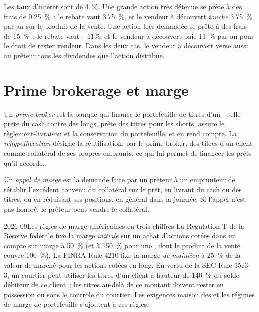 \begin{example}\label{ex:m1:financing:carry}
Les taux d'intérêt sont de 4~\%. Une grande action très détenue se prête à des frais de 0.25~\%~:
le rebate vaut 3.75~\%, et le vendeur à découvert \emph{touche} 3.75~\% par an sur le produit
de la vente. Une action très demandée se prête à des frais de 15~\%~: le rebate vaut
$-11\%$, et le vendeur à découvert paie 11~\% par an pour le droit de rester vendeur. Dans
les deux cas, le vendeur à découvert verse aussi au prêteur tous les dividendes que l'action
distribue.
\end{example}

\section{Prime brokerage et marge}

\begin{definition}\label{def:m1:financing:pb}
Un \emph{prime broker} est la banque qui finance le portefeuille de titres d'un
~: elle prête du cash contre des longs, prête des titres pour les shorts, assure
le règlement-livraison et la conservation du portefeuille, et en rend compte.
La \emph{réhypothécation} désigne la réutilisation, par le prime broker, des
titres d'un client comme collatéral de ses propres emprunts, ce qui lui permet de financer les
prêts qu'il accorde.
\end{definition}

\begin{definition}\label{def:m1:financing:margincall}
Un \emph{appel de marge} est la demande faite par un prêteur à un emprunteur
de rétablir l'excédent convenu du collatéral sur le prêt, en livrant du cash ou des titres, ou en
réduisant ses positions, en général dans la journée. Si l'appel n'est pas honoré, le prêteur
peut vendre le collatéral.
\end{definition}

\begin{dated}{2026-09}{Les règles de marge américaines en trois chiffres}\label{dat:m1:financing:rules}
La Regulation T de la Réserve fédérale fixe la marge \emph{initiale} sur un
achat d'actions cotées dans un compte sur marge à 50~\% (et à 150~\% pour une
, dont le produit de la vente couvre 100~\%). La FINRA Rule 4210 fixe la
marge \emph{de maintien} à 25~\% de la valeur de marché pour les actions cotées en long. En
vertu de la SEC Rule 15c3-3, un courtier peut utiliser les titres d'un client à hauteur de 140~\%
du solde débiteur de ce client~; les titres au-delà de ce montant doivent rester en
possession ou sous le contrôle du courtier. Les exigences maison des 
et les régimes de marge de portefeuille s'ajoutent à ces règles.
\end{dated}

